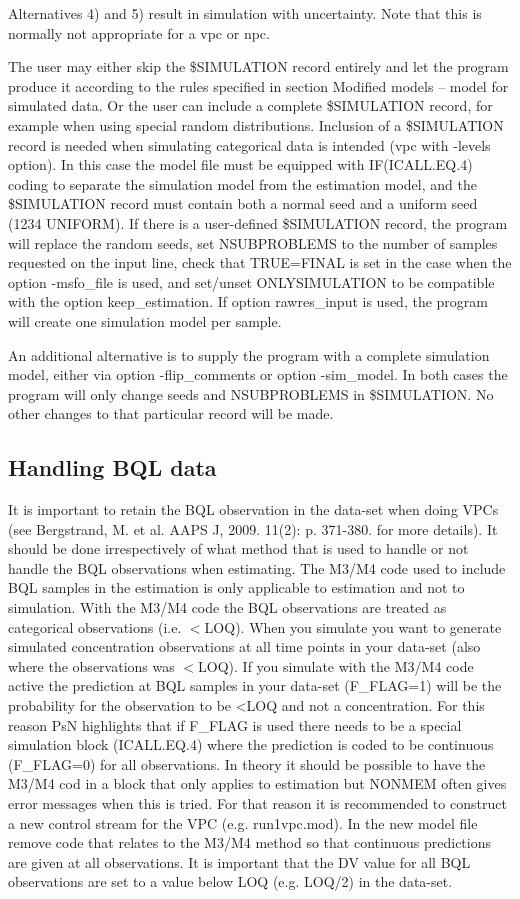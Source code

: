 Alternatives 4) and 5) result in simulation with uncertainty. Note that this is normally not appropriate for a vpc or npc. 

The user may either skip the \$SIMULATION record entirely and let the program produce it according to the rules specified in section Modified models – model for simulated data. Or the user can include a complete \$SIMULATION record, for example when using special random distributions. Inclusion of a \$SIMULATION record is needed when simulating categorical data is intended (vpc with -levels option). In this case the model file must be equipped with IF(ICALL.EQ.4) coding to separate the simulation model from the estimation model, and the \$SIMULATION record must contain both a normal seed and a uniform seed (1234 UNIFORM). If there is a user-defined \$SIMULATION record, the program will replace the random seeds, set NSUBPROBLEMS to the number of samples requested on the input line, check that TRUE=FINAL is set in the case when the option -msfo\_file is used, and set/unset ONLYSIMULATION to be compatible with the option keep\_estimation. If option rawres\_input is used, the program will create one simulation model per sample.

An additional alternative is to supply the program with a complete simulation model, either via option -flip\_comments or option -sim\_model. In both cases the program will only change seeds and NSUBPROBLEMS in \$SIMULATION. No other changes to that particular record will be made.

\subsection{Handling BQL data}
It is important to retain the BQL observation in the data-set when doing VPCs (see Bergstrand, M. et al. AAPS J, 2009. 11(2): p. 371-380. for more details). It should be done irrespectively of what method that is used to handle or not handle the BQL observations when estimating. The M3/M4 code used to include BQL samples in the estimation is only applicable to estimation and not to simulation. With the M3/M4 code the BQL observations are treated as categorical observations (i.e. $<$LOQ). When you simulate you want to generate simulated concentration observations at all time points in your data-set (also where the observations was $<$LOQ). If you simulate with the M3/M4 code active the prediction at BQL samples in your data-set (F\_FLAG=1) will be the probability for the observation to be <LOQ and not a concentration. For this reason PsN highlights that if F\_FLAG is used there needs to be a special simulation block (ICALL.EQ.4) where the prediction is coded to be continuous (F\_FLAG=0) for all observations. In theory it should be possible to have the M3/M4 cod in a block that only applies to estimation but NONMEM often gives error messages when this is tried. For that reason it is recommended to construct a new control stream for the VPC (e.g. run1vpc.mod). In the new model file remove code that relates to the M3/M4 method so that continuous predictions are given at all observations. It is important that the DV value for all BQL observations are set to a value below LOQ (e.g. LOQ/2) in the data-set. 

